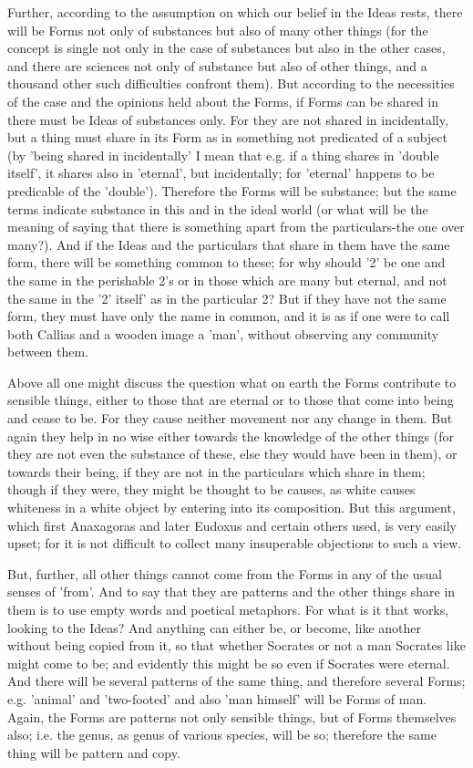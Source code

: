 \documentclass[oneside, 17pt, dvipsnames]{extbook}
\begin{document}
Further, according to the assumption on which our belief in the Ideas rests, there will be Forms not only of substances but also of many other things (for the concept is single not only in the case of substances but also in the other cases, and there are sciences not only of substance but also of other things, and a thousand other such difficulties confront them). But according to the necessities of the case and the opinions held about the Forms, if Forms can be shared in there must be Ideas of substances only. For they are not shared in incidentally, but a thing must share in its Form as in something not predicated of a subject (by 'being shared in incidentally' I mean that e.g. if a thing shares in 'double itself', it shares also in 'eternal', but incidentally; for 'eternal' happens to be predicable of the 'double'). Therefore the Forms will be substance; but the same terms indicate substance in this and in the ideal world (or what will be the meaning of saying that there is something apart from the particulars-the one over many?). And if the Ideas and the particulars that share in them have the same form, there will be something common to these; for why should '2' be one and the same in the perishable 2's or in those which are many but eternal, and not the same in the '2' itself' as in the particular 2? But if they have not the same form, they must have only the name in common, and it is as if one were to call both Callias and a wooden image a 'man', without observing any community between them.

Above all one might discuss the question what on earth the Forms contribute to sensible things, either to those that are eternal or to those that come into being and cease to be. For they cause neither movement nor any change in them. But again they help in no wise either towards the knowledge of the other things (for they are not even the substance of these, else they would have been in them), or towards their being, if they are not in the particulars which share in them; though if they were, they might be thought to be causes, as white causes whiteness in a white object by entering into its composition. But this argument, which first Anaxagoras and later Eudoxus and certain others used, is very easily upset; for it is not difficult to collect many insuperable objections to such a view.

But, further, all other things cannot come from the Forms in any of the usual senses of 'from'. And to say that they are patterns and the other things share in them is to use empty words and poetical metaphors. For what is it that works, looking to the Ideas? And anything can either be, or become, like another without being copied from it, so that whether Socrates or not a man Socrates like might come to be; and evidently this might be so even if Socrates were eternal. And there will be several patterns of the same thing, and therefore several Forms; e.g. 'animal' and 'two-footed' and also 'man himself' will be Forms of man. Again, the Forms are patterns not only sensible things, but of Forms themselves also; i.e. the genus, as genus of various species, will be so; therefore the same thing will be pattern and copy.
\end{document}
